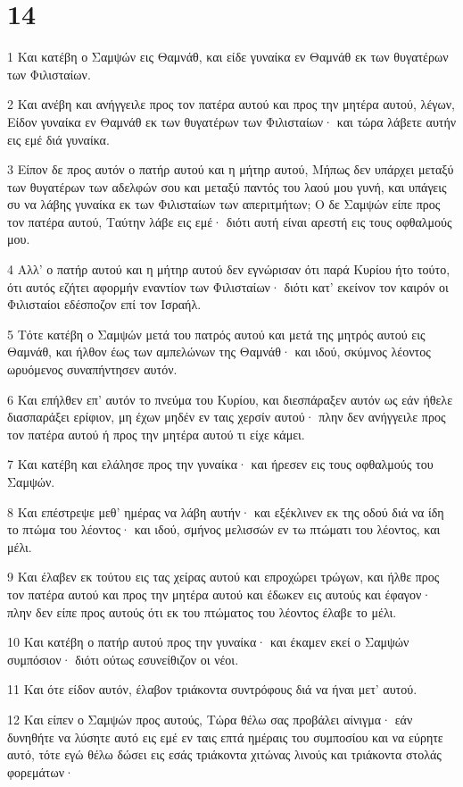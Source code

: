 \chapter{14}

\par 1 Και κατέβη ο Σαμψών εις Θαμνάθ, και είδε γυναίκα εν Θαμνάθ εκ των θυγατέρων των Φιλισταίων.
\par 2 Και ανέβη και ανήγγειλε προς τον πατέρα αυτού και προς την μητέρα αυτού, λέγων, Είδον γυναίκα εν Θαμνάθ εκ των θυγατέρων των Φιλισταίων· και τώρα λάβετε αυτήν εις εμέ διά γυναίκα.
\par 3 Είπον δε προς αυτόν ο πατήρ αυτού και η μήτηρ αυτού, Μήπως δεν υπάρχει μεταξύ των θυγατέρων των αδελφών σου και μεταξύ παντός του λαού μου γυνή, και υπάγεις συ να λάβης γυναίκα εκ των Φιλισταίων των απεριτμήτων; Ο δε Σαμψών είπε προς τον πατέρα αυτού, Ταύτην λάβε εις εμέ· διότι αυτή είναι αρεστή εις τους οφθαλμούς μου.
\par 4 Αλλ' ο πατήρ αυτού και η μήτηρ αυτού δεν εγνώρισαν ότι παρά Κυρίου ήτο τούτο, ότι αυτός εζήτει αφορμήν εναντίον των Φιλισταίων· διότι κατ' εκείνον τον καιρόν οι Φιλισταίοι εδέσποζον επί τον Ισραήλ.
\par 5 Τότε κατέβη ο Σαμψών μετά του πατρός αυτού και μετά της μητρός αυτού εις Θαμνάθ, και ήλθον έως των αμπελώνων της Θαμνάθ· και ιδού, σκύμνος λέοντος ωρυόμενος συναπήντησεν αυτόν.
\par 6 Και επήλθεν επ' αυτόν το πνεύμα του Κυρίου, και διεσπάραξεν αυτόν ως εάν ήθελε διασπαράξει ερίφιον, μη έχων μηδέν εν ταις χερσίν αυτού· πλην δεν ανήγγειλε προς τον πατέρα αυτού ή προς την μητέρα αυτού τι είχε κάμει.
\par 7 Και κατέβη και ελάλησε προς την γυναίκα· και ήρεσεν εις τους οφθαλμούς του Σαμψών.
\par 8 Και επέστρεψε μεθ' ημέρας να λάβη αυτήν· και εξέκλινεν εκ της οδού διά να ίδη το πτώμα του λέοντος· και ιδού, σμήνος μελισσών εν τω πτώματι του λέοντος, και μέλι.
\par 9 Και έλαβεν εκ τούτου εις τας χείρας αυτού και επροχώρει τρώγων, και ήλθε προς τον πατέρα αυτού και προς την μητέρα αυτού και έδωκεν εις αυτούς και έφαγον· πλην δεν είπε προς αυτούς ότι εκ του πτώματος του λέοντος έλαβε το μέλι.
\par 10 Και κατέβη ο πατήρ αυτού προς την γυναίκα· και έκαμεν εκεί ο Σαμψών συμπόσιον· διότι ούτως εσυνείθιζον οι νέοι.
\par 11 Και ότε είδον αυτόν, έλαβον τριάκοντα συντρόφους διά να ήναι μετ' αυτού.
\par 12 Και είπεν ο Σαμψών προς αυτούς, Τώρα θέλω σας προβάλει αίνιγμα· εάν δυνηθήτε να λύσητε αυτό εις εμέ εν ταις επτά ημέραις του συμποσίου και να εύρητε αυτό, τότε εγώ θέλω δώσει εις εσάς τριάκοντα χιτώνας λινούς και τριάκοντα στολάς φορεμάτων·
